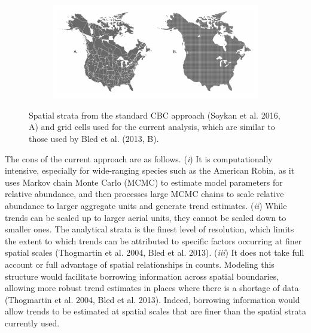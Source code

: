 \documentclass[]{article}
\begin{document}
\begin{figure}[t]
  \centering
  \begin{subfigure}[t]{0.95\textwidth}
    \centering
    \includegraphics[width=\textwidth]{different_strata} 
  \end{subfigure}
  \caption{Spatial strata from the standard CBC approach (Soykan et al. 2016, A) and grid cells used for the current analysis, which are similar to those used by Bled et al. (2013, B).}
\end{figure}

The cons of the current approach are as follows. (\textit{i}) It is computationally intensive, especially for wide-ranging species such as the American Robin, as it uses Markov chain Monte Carlo (MCMC) to estimate model parameters for relative abundance, and then processes large MCMC chains to scale relative abundance to larger aggregate units and generate trend estimates. (\textit{ii}) While trends can be scaled up to larger aerial units, they cannot be scaled down to smaller ones. The analytical strata is the finest level of resolution, which limits the extent to which trends can be attributed to specific factors occurring at finer spatial scales (Thogmartin et al. 2004, Bled et al. 2013). (\textit{iii}) It does not take full account or full advantage of spatial relationships in counts. Modeling this structure would facilitate borrowing information across spatial boundaries, allowing more robust trend estimates in places where there is a shortage of data (Thogmartin et al. 2004, Bled et al. 2013). Indeed, borrowing information would allow trends to be estimated at spatial scales that are finer than the spatial strata currently used.
\end{document}
